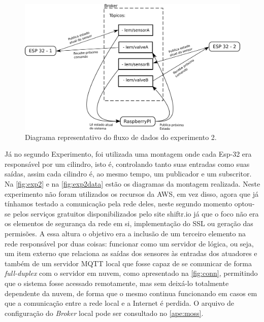 \begin{figure}[htb]
    \begin{center}
	    \includegraphics[width=400pt]{figs/diag_data_exp2.png}
	\end{center}
	\caption{\label{fig:exp2data} Diagrama representativo do fluxo de dados do experimento 2.} 
\end{figure}


Já no segundo Experimento, foi utilizada uma montagem onde cada Esp-32 era responsável por um cilindro, isto é, 
controlando tanto suas entradas como suas saídas, assim cada cilindro é, ao mesmo tempo, um publicador e um subscritor.
Na \autoref{fig:exp2} e na \autoref{fig:exp2data} estão os diagramas da montagem realizada. Neste experimento não foram utilizados os recursos da AWS,
em vez disso, agora que já tínhamos testado a comunicação
pela rede deles, neste segundo momento optou-se pelos serviços gratuitos disponibilizados pelo site shiftr.io já que o foco 
não era os elementos de segurança da rede em si, implementação do \ac{SSL} ou geração das permisões. A essa altura o
objetivo era a inclusão de um terceiro elemento na rede responsável por duas coisas: funcionar como um servidor de lógica,
ou seja, um item externo que relaciona as saídas dos sensores às entradas dos atuadores e também de um servidor \ac{MQTT} local
que fosse capaz de se comunicar de forma \textit{full-duplex} com o servidor em nuvem, como apresentado na 
\autoref{fig:conn}, permitindo que o sistema fosse acessado 
remotamente, mas sem deixá-lo totalmente dependente da nuvem, de forma que o mesmo continua funcionando em casos em que 
a comunicação entre a rede local e a Internet é perdida. O arquivo de configuração do \textit{Broker} local pode ser consultado
no \autoref{ape:moss}.

